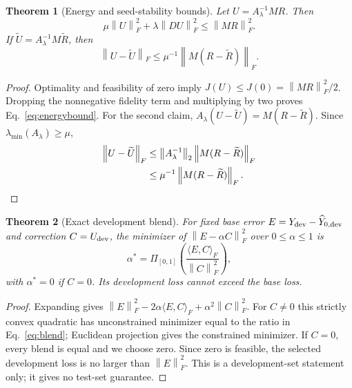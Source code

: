 \documentclass[10pt,letterpaper,twoside]{article}
\newtheorem{theorem}{Theorem}
\newcommand{\norm}[1]{\left\lVert #1\right\rVert}
\begin{document}
\begin{theorem}[Energy and seed-stability bounds]
\label{thm:stability}
Let $U=A_\lambda^{-1}MR$.  Then
\begin{equation}
 \mu\norm{U}_F^2+\lambda\norm{DU}_F^2\le\norm{MR}_F^2.
\label{eq:energybound}
\end{equation}
If $\widetilde U=A_\lambda^{-1}M\widetilde R$, then
\begin{equation}
 \norm{U-\widetilde U}_F\le \mu^{-1}\norm{M(R-\widetilde R)}_F.
\label{eq:seedbound}
\end{equation}
\end{theorem}
\begin{proof}
Optimality and feasibility of zero imply
$J(U)\le J(0)=\norm{MR}_F^2/2$.  Dropping the nonnegative fidelity term and
multiplying by two proves Eq.~\eqref{eq:energybound}.  For the second claim,
$A_\lambda(U-\widetilde U)=M(R-\widetilde R)$.  Since
$\lambda_{\min}(A_\lambda)\ge\mu$,
\begin{align}
 \norm{U-\widetilde U}_F
 &\le\norm{A_\lambda^{-1}}_2\norm{M(R-\widetilde R)}_F\notag\\
 &\le\mu^{-1}\norm{M(R-\widetilde R)}_F.
\end{align}
\end{proof}

\begin{theorem}[Exact development blend]
\label{thm:blend}
For fixed base error $E=Y_{\rm dev}-\widehat Y_{0,\rm dev}$ and correction
$C=U_{\rm dev}$, the minimizer of $\norm{E-\alpha C}_F^2$ over
$0\le\alpha\le1$ is
\begin{equation}
 \alpha^*=\Pi_{[0,1]}
 \left(\frac{\langle E,C\rangle_F}{\norm{C}_F^2}\right),
\label{eq:blend}
\end{equation}
with $\alpha^*=0$ if $C=0$.  Its development loss cannot exceed the base loss.
\end{theorem}
\begin{proof}
Expanding gives
$\norm{E}_F^2-2\alpha\langle E,C\rangle_F+\alpha^2\norm{C}_F^2$.
For $C\ne0$ this strictly convex quadratic has unconstrained minimizer equal
to the ratio in Eq.~\eqref{eq:blend}; Euclidean projection gives the constrained
minimizer.  If $C=0$, every blend is equal and we choose zero.  Since zero is
feasible, the selected development loss is no larger than $\norm{E}_F^2$.
This is a development-set statement only; it gives no test-set guarantee.
\end{proof}
\end{document}
